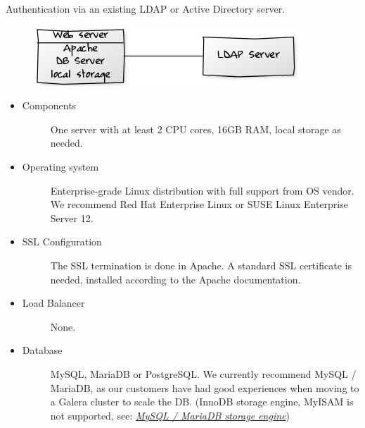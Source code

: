 \documentclass[letterpaper,10pt,english]{sphinxmanual}
\begin{document}
Authentication via an existing LDAP or Active Directory server.
\begin{figure}[htbp]
\centering

\includegraphics{deprecs-1.png}
\end{figure}
\begin{itemize}
\item {} \begin{description}
\item[{Components}] \leavevmode
One server with at least 2 CPU cores, 16GB RAM, local storage as needed.

\end{description}

\item {} \begin{description}
\item[{Operating system}] \leavevmode
Enterprise-grade Linux distribution with full support from OS vendor. We
recommend Red Hat Enterprise Linux or SUSE Linux Enterprise Server 12.

\end{description}

\item {} \begin{description}
\item[{SSL Configuration}] \leavevmode
The SSL termination is done in Apache. A standard SSL certificate is
needed, installed according to the Apache documentation.

\end{description}

\item {} \begin{description}
\item[{Load Balancer}] \leavevmode
None.

\end{description}

\item {} \begin{description}
\item[{Database}] \leavevmode
MySQL, MariaDB or PostgreSQL. We currently recommend MySQL / MariaDB, as our
customers have had good experiences when moving to a Galera cluster to
scale the DB. (InnoDB storage engine, MyISAM is not supported, see: {\hyperref[configuration_database/linux_database_configuration:db-storage-engine-label]{\emph{MySQL / MariaDB storage engine}}})


\end{description}
\end{itemize}
\end{document}
